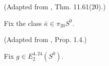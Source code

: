 \begin{definition}
\label{frontier:Literature:051dbca71e3a}
(Adapted from \cite{BR21}, Thm. 11.61(20).)\par{}

Fix the class $\bar\kappa\in\pi_{20}S^0$.
\end{definition}



\begin{definition}
\label{frontier:Literature:174e2bfc0dfb}
(Adapted from \cite{BR21}, Prop. 1.4.)\par{}

Fix $g\in E_2^{4,24}(S^0)$.
\end{definition}

